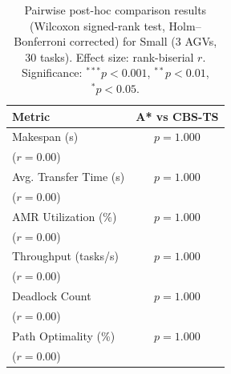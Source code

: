 \begin{table}[htbp]
\centering
\caption{Pairwise post-hoc comparison results (Wilcoxon signed-rank test, Holm--Bonferroni corrected) for Small (3 AGVs, 30 tasks). Effect size: rank-biserial $r$. Significance: ${}^{***}p<0.001$, ${}^{**}p<0.01$, ${}^{*}p<0.05$.}
\label{tab:significance}
\small
\begin{tabular}{@{}lc@{}}
\toprule
\textbf{Metric} & \textbf{A* vs CBS-TS} \\
\midrule
Makespan (s) & $p=1.000$\\($r=0.00$) \\
Avg. Transfer Time (s) & $p=1.000$\\($r=0.00$) \\
AMR Utilization (\%) & $p=1.000$\\($r=0.00$) \\
Throughput (tasks/s) & $p=1.000$\\($r=0.00$) \\
Deadlock Count & $p=1.000$\\($r=0.00$) \\
Path Optimality (\%) & $p=1.000$\\($r=0.00$) \\
\bottomrule
\end{tabular}
\end{table}